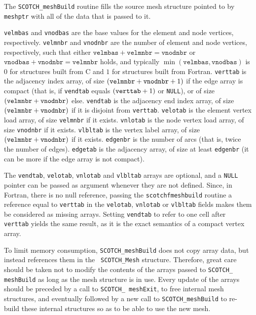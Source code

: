 \begin{itemize}
\progdes

The {\tt SCOTCH\_meshBuild} routine fills the source mesh structure
pointed to by {\tt meshptr} with all of the data that is passed to it.

{\tt velmbas} and {\tt vnodbas} are the base values for the element
and node vertices, respectively.
{\tt velmnbr} and {\tt vnodnbr} are the number of element and node
vertices, respectively, such that either $\mathtt{velmbas}
+\mathtt{velmnbr}=\mathtt{vnodnbr}$ or $\mathtt{vnodbas}
+\mathtt{vnodnbr}=\mathtt{velmnbr}$ holds, and typically
$\min(\mathtt{velmbas}, \mathtt{vnodbas})$ is $0$ for
structures built from C and $1$ for structures built from Fortran.
{\tt verttab} is the adjacency index array, of size $({\tt velmnbr} +
{\tt vnodnbr} + 1)$ if the edge array is compact (that is, if
{\tt vendtab} equals $(\mbox{\texttt{verttab}}+1)$ or {\tt NULL}), or of
size $({\tt velmnbr} + {\tt vnodnbr})$ else.
{\tt vendtab} is the adjacency end index array, of size $({\tt velmnbr} +
{\tt vnodnbr})$ if it is disjoint from {\tt verttab}.
{\tt velotab} is the element vertex load array, of size {\tt velmnbr}
if it exists.
{\tt vnlotab} is the node vertex load array, of size {\tt vnodnbr} if
it exists.
{\tt vlbltab} is the vertex label array, of size $({\tt velmnbr} +
{\tt vnodnbr})$ if it exists.
{\tt edgenbr} is the number of arcs (that is, twice the number of edges).
{\tt edgetab} is the adjacency array, of size at least {\tt edgenbr}
(it can be more if the edge array is not compact).

The {\tt vendtab}, {\tt velotab}, {\tt vnlotab} and {\tt vlbltab}
arrays are optional, and a {\tt NULL} pointer can be passed as
argument whenever they are not defined.
Since, in Fortran, there is no null reference, passing the
{\tt scotchf\lbt mesh\lbt build} routine a reference equal to
{\tt verttab} in the {\tt velotab}, {\tt vnlotab} or {\tt vlbltab}
fields makes them be considered as missing arrays. Setting
{\tt vendtab} to refer to one cell after {\tt verttab} yields the
same result, as it is the exact semantics of a compact vertex array.

To limit memory consumption, {\tt SCOTCH\_\lbt mesh\lbo Build} does
not copy array data, but instead references them in the {\tt
SCOTCH\_\lbt Mesh} structure. Therefore, great care should be taken
not to modify the contents of the arrays passed to {\tt SCOTCH\_\lbt
mesh\lbo Build} as long as the mesh structure is in use. Every
update of the arrays should be preceded by a call to {\tt SCOTCH\_\lbt
mesh\lbo Exit}, to free internal mesh structures, and eventually
followed by a new call to {\tt SCOTCH\_\lbt mesh\lbo Build} to
re-build these internal structures so as to be able to use the new
mesh.


\end{itemize}
